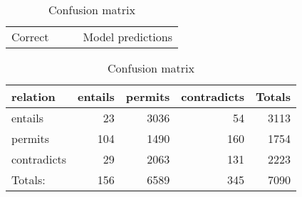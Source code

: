 \begin{table}[ht] \label{confusion_matrix}
\begin{small}
\begin{tabular}{lccc}
Correct &  & & Model predictions\\
\end{tabular}
\begin{tabular}{lrrrr}
\centering
relation    &     entails  &  permits & contradicts & Totals\\
\hline
entails & 23 & 3036  & 54 & 3113\\
permits & 104 & 1490  & 160 & 1754\\
contradicts & 29 & 2063  & 131 & 2223\\
\hline \hline
Totals: & 156 & 6589  & 345 & 7090\\
\end{tabular}
\caption {Confusion matrix}
\end{small}
\end{table}
